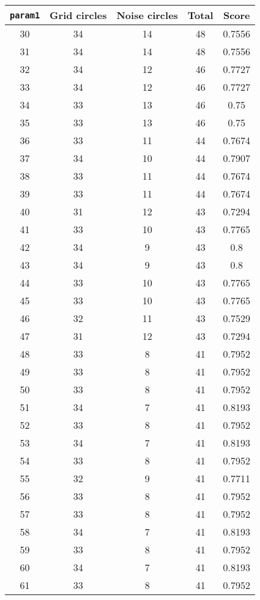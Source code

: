 \documentclass[letterpaper, 12pt]{article}
\begin{document}
\begin{longtable}{|c|c|c|c|c|}
\hline
\textbf{\texttt{param1}} & \textbf{Grid circles} & \textbf{Noise circles} & \textbf{Total} & \textbf{Score} \\
\hline
30 & 34 & 14 & 48 & 0.7556 \\
\hline
31 & 34 & 14 & 48 & 0.7556 \\
\hline
32 & 34 & 12 & 46 & 0.7727 \\
\hline
33 & 34 & 12 & 46 & 0.7727 \\
\hline
34 & 33 & 13 & 46 & 0.75 \\
\hline
35 & 33 & 13 & 46 & 0.75 \\
\hline
36 & 33 & 11 & 44 & 0.7674 \\
\hline
37 & 34 & 10 & 44 & 0.7907 \\
\hline
38 & 33 & 11 & 44 & 0.7674 \\
\hline
39 & 33 & 11 & 44 & 0.7674 \\
\hline
40 & 31 & 12 & 43 & 0.7294 \\
\hline
41 & 33 & 10 & 43 & 0.7765 \\
\hline
42 & 34 & 9 & 43 & 0.8 \\
\hline
43 & 34 & 9 & 43 & 0.8 \\
\hline
44 & 33 & 10 & 43 & 0.7765 \\
\hline
45 & 33 & 10 & 43 & 0.7765 \\
\hline
46 & 32 & 11 & 43 & 0.7529 \\
\hline
47 & 31 & 12 & 43 & 0.7294 \\
\hline
48 & 33 & 8 & 41 & 0.7952 \\
\hline
49 & 33 & 8 & 41 & 0.7952 \\
\hline
50 & 33 & 8 & 41 & 0.7952 \\
\hline
51 & 34 & 7 & 41 & 0.8193 \\
\hline
52 & 33 & 8 & 41 & 0.7952 \\
\hline
53 & 34 & 7 & 41 & 0.8193 \\
\hline
54 & 33 & 8 & 41 & 0.7952 \\
\hline
55 & 32 & 9 & 41 & 0.7711 \\
\hline
56 & 33 & 8 & 41 & 0.7952 \\
\hline
57 & 33 & 8 & 41 & 0.7952 \\
\hline
58 & 34 & 7 & 41 & 0.8193 \\
\hline
59 & 33 & 8 & 41 & 0.7952 \\
\hline
60 & 34 & 7 & 41 & 0.8193 \\
\hline
61 & 33 & 8 & 41 & 0.7952 \\

\end{longtable}
\end{document}
